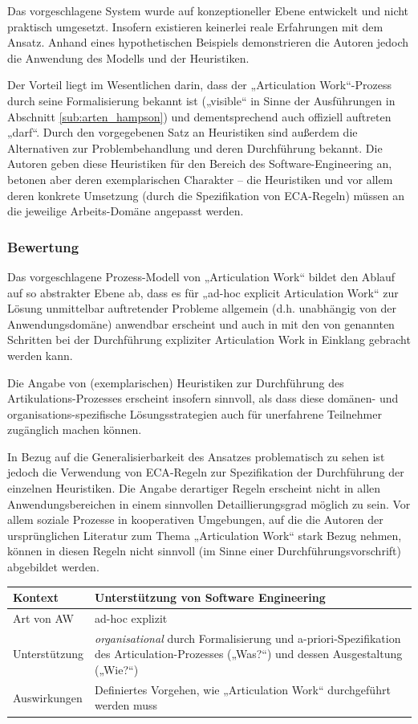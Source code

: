Das vorgeschlagene System wurde auf konzeptioneller Ebene entwickelt und nicht praktisch umgesetzt. Insofern existieren keinerlei reale Erfahrungen mit dem Ansatz. Anhand eines hypothetischen Beispiels demonstrieren die Autoren jedoch die Anwendung des Modells und der Heuristiken.

Der Vorteil liegt im Wesentlichen darin, dass der „Articulation Work“-Prozess durch seine Formalisierung bekannt ist („visible“ in Sinne der Ausführungen in Abschnitt \ref{sub:arten_hampson}) und dementsprechend auch offiziell auftreten „darf“. Durch den vorgegebenen Satz an Heuristiken sind außerdem die Alternativen zur Problembehandlung und deren Durchführung bekannt. Die Autoren geben diese Heuristiken für den Bereich des Software-Engineering an, betonen aber deren exemplarischen Charakter -- die Heuristiken und vor allem deren konkrete Umsetzung (durch die Spezifikation von \gls{ECA}-Regeln) müssen an die jeweilige Arbeits-Domäne angepasst werden. 

\subsubsection{Bewertung}

Das vorgeschlagene Prozess-Modell von „Articulation Work“ bildet den Ablauf auf so abstrakter Ebene ab, dass es für „ad-hoc explicit Articulation Work“ zur Lösung unmittelbar auftretender Probleme allgemein (d.h. unabhängig von der Anwendungsdomäne) anwendbar erscheint und auch in mit den von \cite{Corbin93} genannten Schritten bei der Durchführung expliziter Articulation Work in Einklang gebracht werden kann.

Die Angabe von (exemplarischen) Heuristiken zur Durchführung des Artikulations-Prozesses erscheint insofern sinnvoll, als dass diese domänen- und organisations-spezifische Lösungsstrategien auch für unerfahrene Teilnehmer zugänglich machen können.

In Bezug auf die Generalisierbarkeit des Ansatzes problematisch zu sehen ist jedoch die Verwendung von \gls{ECA}-Regeln zur Spezifikation der Durchführung der einzelnen Heuristiken. Die Angabe derartiger Regeln erscheint nicht in allen Anwendungsbereichen in einem sinnvollen Detaillierungsgrad möglich zu sein. Vor allem soziale Prozesse in kooperativen Umgebungen, auf die die Autoren der ursprünglichen Literatur zum Thema „Articulation Work“ stark Bezug nehmen, können in diesen Regeln nicht sinnvoll (im Sinne einer Durchführungsvorschrift) abgebildet werden.
\\[1em]
\begin{tabular}{| p{3cm} | p{10cm} |}
  \hline
  Kontext & Unterstützung von Software Engineering \\ \hline
  Art von AW & ad-hoc explizit \\ \hline
  Unterstützung & \emph{organisational} durch Formalisierung und a-priori-Spezifikation des Articulation-Prozesses („Was?“) und dessen Ausgestaltung („Wie?“) \\ \hline
  Auswirkungen & Definiertes Vorgehen, wie „Articulation Work“ durchgeführt werden muss \\ \hline
\end{tabular}

